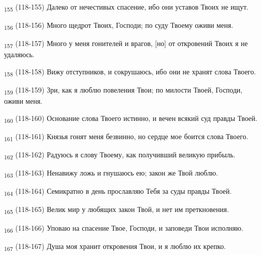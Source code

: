 \begin{tcolorbox}
\textsubscript{155} (118-155) Далеко от нечестивых спасение, ибо они уставов Твоих не ищут.
\end{tcolorbox}
\begin{tcolorbox}
\textsubscript{156} (118-156) Много щедрот Твоих, Господи; по суду Твоему оживи меня.
\end{tcolorbox}
\begin{tcolorbox}
\textsubscript{157} (118-157) Много у меня гонителей и врагов, [но] от откровений Твоих я не удаляюсь.
\end{tcolorbox}
\begin{tcolorbox}
\textsubscript{158} (118-158) Вижу отступников, и сокрушаюсь, ибо они не хранят слова Твоего.
\end{tcolorbox}
\begin{tcolorbox}
\textsubscript{159} (118-159) Зри, как я люблю повеления Твои; по милости Твоей, Господи, оживи меня.
\end{tcolorbox}
\begin{tcolorbox}
\textsubscript{160} (118-160) Основание слова Твоего истинно, и вечен всякий суд правды Твоей.
\end{tcolorbox}
\begin{tcolorbox}
\textsubscript{161} (118-161) Князья гонят меня безвинно, но сердце мое боится слова Твоего.
\end{tcolorbox}
\begin{tcolorbox}
\textsubscript{162} (118-162) Радуюсь я слову Твоему, как получивший великую прибыль.
\end{tcolorbox}
\begin{tcolorbox}
\textsubscript{163} (118-163) Ненавижу ложь и гнушаюсь ею; закон же Твой люблю.
\end{tcolorbox}
\begin{tcolorbox}
\textsubscript{164} (118-164) Семикратно в день прославляю Тебя за суды правды Твоей.
\end{tcolorbox}
\begin{tcolorbox}
\textsubscript{165} (118-165) Велик мир у любящих закон Твой, и нет им преткновения.
\end{tcolorbox}
\begin{tcolorbox}
\textsubscript{166} (118-166) Уповаю на спасение Твое, Господи, и заповеди Твои исполняю.
\end{tcolorbox}
\begin{tcolorbox}
\textsubscript{167} (118-167) Душа моя хранит откровения Твои, и я люблю их крепко.
\end{tcolorbox}
